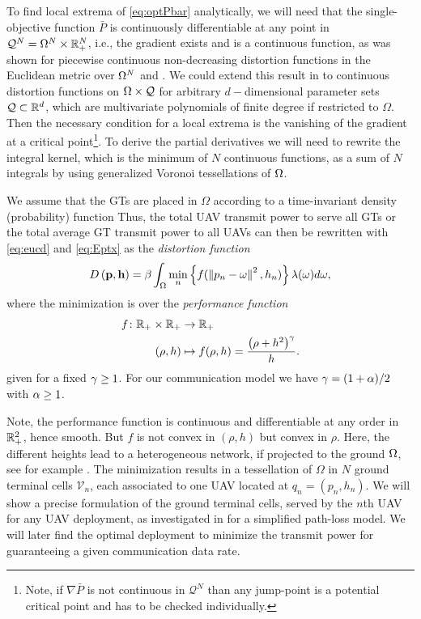 \documentclass[smallabstract,smallcaptions]{dccpaper}
\newcommand{\disfunction}{distortion function}
\newcounter{example}[section]
\newcommand{\df}{\ensuremath{\lam}}         %
\newcommand{\bP}{\ensuremath{\vp}}          %
\newcommand{\bH}{\ensuremath{\vh}}          %
\newcommand{\Pbar}{\ensuremath{\bar{P}}}         %
\newcommand{\Vor}{\ensuremath{\mathcal{V}}}         %
\newcommand{\Qset}{\ensuremath{\mathcal Q}}
\begin{document}
To find local extrema of \eqref{eq:optPbar} analytically, we will need that the single-objective function $\Pbar$ is
continuously differentiable at any point in $\Qset^N=\Omega^N\times \R_+^N$, i.e., the gradient exists and is a
continuous function, as was shown for piecewise continuous non-decreasing distortion functions in the Euclidean metric
over $\Omega^N$ \cite[Thm.2.2]{CMB05} and \cite{GJ16a}. We could extend this result in \cite{WJ18} to continuous
\disfunction s on $\Ome\times\Qset$ for arbitrary $d-$dimensional parameter sets $\Qset\subset \R^d$, which are multivariate polynomials of finite degree
if restricted to $\Omega$.  Then the necessary condition for a local extrema is the vanishing of the gradient at a
critical point\footnote{Note, if $\nabla \Pbar$ is not continuous in $\Qset^N$ than any jump-point is a potential
  critical point and has to be checked individually.}.  To derive the partial derivatives we will need to rewrite the
  integral kernel, which is the minimum of $N$ continuous functions, as a sum of $N$ integrals by using  generalized
  Voronoi tessellations of $\Omega$.
%





We assume that the GTs  are placed in $\Omega$ according to a time-invariant density (probability) function
  Thus, the total
UAV transmit power to serve all GTs or the total average GT transmit power to all UAVs can then be rewritten with
\eqref{eq:eucd} and \eqref{eq:Eptx} as the \emph{distortion function}
%
\begin{equation}
  D\left(\bP,\bH\right)=\bet\int_{\Omega}\min_{n} \left\{ f(\Norm{p_n-\ome}^2,h_n) \right\} \df(\omega)d\omega,
 \label{obj0}
\end{equation}
%
where the minimization is over the \emph{performance function}
%
\begin{align}
 f \colon {\ensuremath{\mathbb R}}_+\times {\ensuremath{\mathbb R}}_+ &\to {\ensuremath{\mathbb R}}_+\\
           (\rho,h)&\mapsto f(\rho,h)=\frac{\left(\rho+h^2\right)^{\gamma}}{h}.
\end{align}
%
given for a fixed $\gamma\geq 1$. For our communication model we have $\gamma=(1+\alpha)/2$ with $\alpha\geq 1$.

Note, the performance function is continuous and differentiable at any order in ${\mathbb R}^2_+$, hence smooth. But $f$ is not
convex in $(\rho,h)$ but convex in $\rho$. 
Here, the different heights lead to a heterogeneous network, if projected to the ground $\Omega$, see for example
\cite{GJ16a}.  The minimization results in a tessellation of $\Omega$ in $N$ ground terminal cells $\Vor_n$, each
associated to one UAV located at $q_n=(p_n,h_n)$.  We will show a precise formulation of the ground terminal cells,
served by the $n$th UAV for any UAV deployment, as investigated in \cite{MSBD16b} for a simplified path-loss model. We
will later find the optimal deployment to minimize the transmit power for guaranteeing a given communication data rate.
%
\fi
\end{document}
